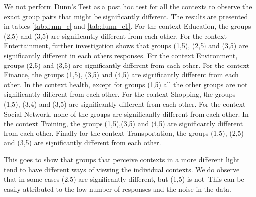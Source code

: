 We not perform Dunn's Test as a post hoc test for all the contexts to observe the exact group pairs that might be significantly different. The results are presented in tables \ref{tab:dunn_c} and \ref{tab:dunn_c1}. For the context Education, the groups (2,5) and (3,5) are significantly different from each other. 
For the context Entertainment, further investigation shows that groups (1,5), (2,5) and (3,5) are significantly different in each others responses.
For the context Environment, groups (2,5) and (3,5) are significantly different from each other. For the context Finance, the groups (1,5), (3,5) and (4,5) are significantly different from each other. In the context health, except for groups (1,5) all the other groups are not significantly different from each other.
For the context Shopping, the groups (1,5), (3,4) and (3,5) are significantly different from each other. For the context Social Network, none of the groups are significantly different from each other. In the context Training, the groups (1,5),(3,5) and (4,5) are significantly different from each other.
Finally for the context Transportation, the groups (1,5), (2,5) and (3,5) are significantly different from each other.

This goes to show that groups that perceive contexts in a more different light tend to have different ways of viewing the individual contexts. We do observe that in some cases (2,5) are significantly different, but (1,5) is not. This can be easily attributed to the low number of responses
and the noise in the data.

